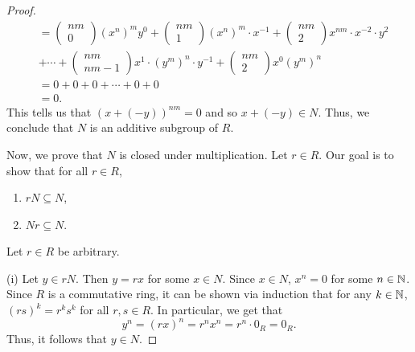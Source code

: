 \documentclass[a4paper]{article}
\begin{document}
\begin{problem}
\begin{enumerate}
\begin{proof}
\begin{align*}
                                              &= \begin{pmatrix} nm \\ 0  \end{pmatrix}  (x^{n})^{m} y^{0} + \begin{pmatrix} nm \\ 1  \end{pmatrix}  (x^{n})^{m} \cdot x^{-1} + \begin{pmatrix} nm \\ 2  \end{pmatrix}  x^{nm} \cdot x^{-2} \cdot y^{2} \\
                                              &+ \cdots + \begin{pmatrix} nm \\ nm - 1  \end{pmatrix}  x^{1} \cdot (y^{m})^{n} \cdot y^{-1} + \begin{pmatrix} nm \\ 2  \end{pmatrix} x^{0}  (y^{m})^{n} \\
                                              &= 0 + 0 + 0 + \cdots + 0 + 0 \\
                                              &= 0.
           \end{align*}
           This tells us that \( (x + (-y))^{nm}   = 0 \) and so \( x + (-y) \in N  \). Thus, we conclude that \( N  \) is an additive subgroup of \( R  \).

           Now, we prove that \( N  \) is closed under multiplication. Let \( r \in R  \). Our goal is to show that for all \( r \in R  \), 
           \begin{enumerate}
               \item[(i)] \( rN \subseteq N  \),
                \item[(ii)] \( Nr \subseteq N  \).
           \end{enumerate}
           Let \( r \in R  \) be arbitrary. 

           (i) Let \( y \in r N  \). Then \( y = rx  \) for some \( x \in N  \). Since \( x \in N  \), \( x^{n} = 0  \) for some \( n \in \mathbb{N}  \). Since \( R  \) is a commutative ring, it can be shown via induction that for any \( k \in \mathbb{N}  \), \( (rs)^{k} = r^{k} s^{k} \) for all \( r,s \in R  \). In particular, we get that 
           \[  y^{n} = (rx)^{n} = r^{n} x^{n} = r^{n} \cdot 0_R = 0_R. \]
           Thus, it follows that \( y \in N \). 


\end{proof}
\end{enumerate}
\end{problem}
\end{document}
